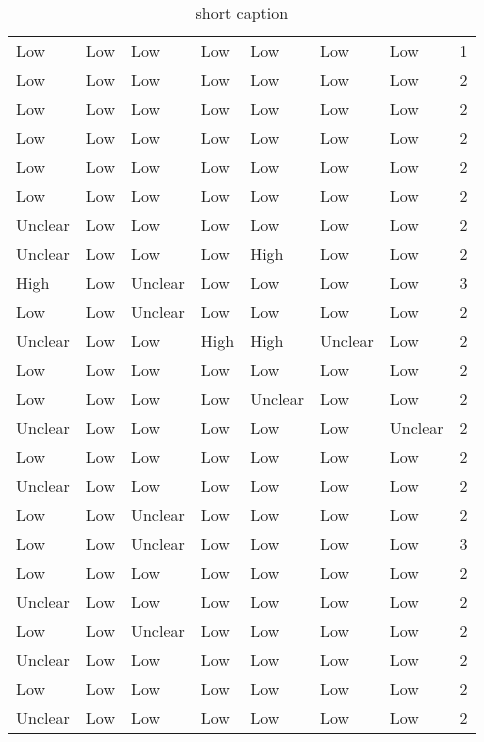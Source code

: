 \begin{table}[ht]
\begin{tabular}{llllllll}
  Low & Low & Low & Low & Low & Low & Low & 1 \\ 
  Low & Low & Low & Low & Low & Low & Low & 2 \\ 
  Low & Low & Low & Low & Low & Low & Low & 2 \\ 
  Low & Low & Low & Low & Low & Low & Low & 2 \\ 
  Low & Low & Low & Low & Low & Low & Low & 2 \\ 
  Low & Low & Low & Low & Low & Low & Low & 2 \\ 
  Unclear & Low & Low & Low & Low & Low & Low & 2 \\ 
  Unclear & Low & Low & Low & High & Low & Low & 2 \\ 
  High & Low & Unclear & Low & Low & Low & Low & 3 \\ 
  Low & Low & Unclear & Low & Low & Low & Low & 2 \\ 
  Unclear & Low & Low & High & High & Unclear & Low & 2 \\ 
  Low & Low & Low & Low & Low & Low & Low & 2 \\ 
  Low & Low & Low & Low & Unclear & Low & Low & 2 \\ 
  Unclear & Low & Low & Low & Low & Low & Unclear & 2 \\ 
  Low & Low & Low & Low & Low & Low & Low & 2 \\ 
  Unclear & Low & Low & Low & Low & Low & Low & 2 \\ 
  Low & Low & Unclear & Low & Low & Low & Low & 2 \\ 
  Low & Low & Unclear & Low & Low & Low & Low & 3 \\ 
  Low & Low & Low & Low & Low & Low & Low & 2 \\ 
  Unclear & Low & Low & Low & Low & Low & Low & 2 \\ 
  Low & Low & Unclear & Low & Low & Low & Low & 2 \\ 
  Unclear & Low & Low & Low & Low & Low & Low & 2 \\ 
  Low & Low & Low & Low & Low & Low & Low & 2 \\ 
  Unclear & Low & Low & Low & Low & Low & Low & 2 \\ 
   \hline
\end{tabular}
\endgroup
\caption[full caption]{short caption} 
\label{tab:qual_scores}
\end{table}
